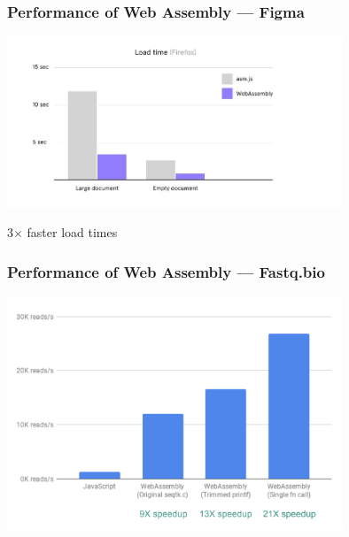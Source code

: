 \documentclass{beamer}
\begin{document}
\begin{frame}
    \frametitle{Performance of Web Assembly — Figma}
    \begin{center}
        \includegraphics[width=10cm]{figma_perf.png}

    \end{center}

    \begin{center}
        3$\times$ faster load times
    \end{center}
\end{frame}

\begin{frame}
    \frametitle{Performance of Web Assembly — Fastq.bio}
    \begin{center}
        \includegraphics[width=10cm]{fastq.png}

    \end{center}
\end{frame}
\end{document}
